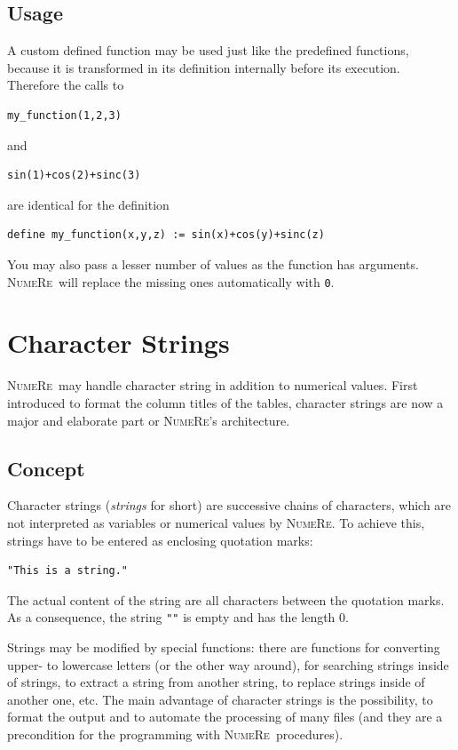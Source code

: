 \documentclass[DIV=14,headsepline,footsepline]{scrbook}
\newcommand{\NR}{\textsc{Nu\-me\-Re}}
\begin{document}
			\section{Usage}
				A custom defined function may be used just like the predefined functions, because it is transformed in its definition internally before its execution. Therefore the calls to
				\begin{lstlisting}
my_function(1,2,3)
				\end{lstlisting}
				and 
				\begin{lstlisting}
sin(1)+cos(2)+sinc(3)
				\end{lstlisting}
				are identical for the definition
				\begin{lstlisting}
define my_function(x,y,z) := sin(x)+cos(y)+sinc(z)
				\end{lstlisting}
				You may also pass a lesser number of values as the function has arguments. \NR\ will replace the missing ones automatically with \verb+0+.
		\chapter{Character Strings}
			\NR\ may handle character string in addition to numerical values. First introduced to format the column titles of the tables, character strings are now a major and elaborate part or \NR's architecture.
			\section{Concept}
				Character strings (\emph{strings} for short) are successive chains of characters, which are not interpreted as variables or numerical values by \NR. To achieve this, strings have to be entered as enclosing quotation marks:
				\begin{lstlisting}
"This is a string."
				\end{lstlisting}
				The actual content of the string are all characters between the quotation marks. As a consequence, the string \verb+""+ is empty and has the length 0.
				
				Strings may be modified by special functions: there are functions for converting upper- to lowercase letters (or the other way around), for searching strings inside of strings, to extract a string from another string, to replace strings inside of another one, etc. The main advantage of character strings is the possibility, to format the output and to automate the processing of many files (and they are a precondition for the programming with \NR\ procedures).
				
\end{document}

